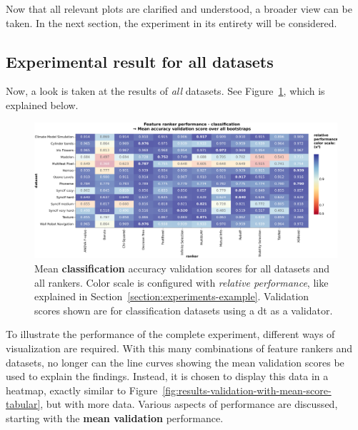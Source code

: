 \documentclass[../main.tex]{subfiles}
\begin{document}
Now that all relevant plots are clarified and understood, a broader view can be taken. In the next section, the experiment in its entirety will be considered.



\subsection{Experimental result for all datasets}
Now, a look is taken at the results of \textit{all} datasets. See Figure~\ref{fig:results-all-datasets-mean-validation-dt}, which is explained below.

\begin{figure}[ht]
    \centering
    \includegraphics[width=\linewidth]{report/images/results-all-datasets-mean-validation-dt.pdf}
    \caption{Mean \textbf{classification} accuracy validation scores for all datasets and all rankers. Color scale is configured with \textit{relative performance}, like explained in Section~\ref{section:experiments-example}. Validation scores shown are for classification datasets using a \gls{dt} as a validator.}
    \label{fig:results-all-datasets-mean-validation-dt}
\end{figure}

To illustrate the performance of the complete experiment, different ways of visualization are required. With this many combinations of feature rankers and datasets, no longer can the line curves showing the mean validation scores be used to explain the findings. Instead, it is chosen to display this data in a heatmap, exactly similar to Figure~\ref{fig:results-validation-with-mean-score-tabular}, but with more data. Various aspects of performance are discussed, starting with the \textbf{mean validation} performance. 
\end{document}
